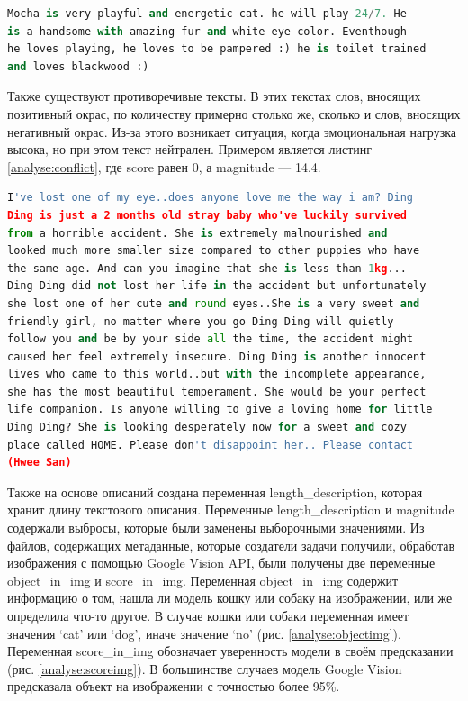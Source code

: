 \documentclass[14pt]{mmcs_article}
\begin{document}
\begin{lstlisting}[language=Python, caption={Пример позитивно окрашенного текста}, label=analyse:pos]
Mocha is very playful and energetic cat. he will play 24/7. He 
is a handsome with amazing fur and white eye color. Eventhough 
he loves playing, he loves to be pampered :) he is toilet trained 
and loves blackwood :)
\end{lstlisting}

Также существуют противоречивые тексты. В этих текстах слов, вносящих позитивный окрас, по количеству примерно столько же, сколько и слов, вносящих негативный окрас. Из-за этого возникает ситуация, когда эмоциональная нагрузка высока, но при этом текст нейтрален. Примером является листинг \ref{analyse:conflict}, где score равен 0, а magnitude — 14.4.

\begin{lstlisting}[language=Python, caption={Пример противоречивого текста}, label=analyse:conflict]
I've lost one of my eye..does anyone love me the way i am? Ding 
Ding is just a 2 months old stray baby who've luckily survived 
from a horrible accident. She is extremely malnourished and 
looked much more smaller size compared to other puppies who have 
the same age. And can you imagine that she is less than 1kg... 
Ding Ding did not lost her life in the accident but unfortunately 
she lost one of her cute and round eyes..She is a very sweet and 
friendly girl, no matter where you go Ding Ding will quietly 
follow you and be by your side all the time, the accident might 
caused her feel extremely insecure. Ding Ding is another innocent 
lives who came to this world..but with the incomplete appearance, 
she has the most beautiful temperament. She would be your perfect 
life companion. Is anyone willing to give a loving home for little 
Ding Ding? She is looking desperately now for a sweet and cozy 
place called HOME. Please don't disappoint her.. Please contact 
(Hwee San)
\end{lstlisting}

Также на основе описаний создана переменная length\_description, которая хранит длину текстового описания. Переменные length\_description и magnitude содержали выбросы, которые были заменены выборочными значениями.
Из файлов, содержащих метаданные, которые создатели задачи получили, обработав изображения с помощью Google Vision API, были получены две переменные object\_in\_img и score\_in\_img. Переменная object\_in\_img содержит информацию о том, нашла ли модель кошку или собаку на изображении, или же определила что-то другое. В случае кошки или собаки переменная имеет значения `cat' или `dog', иначе значение `no' (рис. \ref{analyse:objectimg}). Переменная score\_in\_img обозначает уверенность модели в своём предсказании (рис. \ref{analyse:scoreimg}). В большинстве случаев модель Google Vision предсказала объект на изображении с точностью более 95\%.
\end{document}
